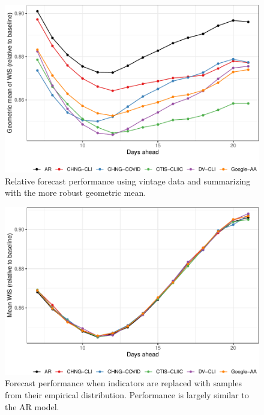 \documentclass[9pt,twoside,lineno]{pnas-new}
\begin{document}
\clearpage

\begin{figure}

{\centering \includegraphics[width=\textwidth]{fig/fcast-adjusted-1} 

}

\caption{Relative forecast performance using vintage data and summarizing with the more robust geometric mean.}\label{fig:fcast-adjusted}
\end{figure}

\clearpage

\begin{figure}

{\centering \includegraphics[width=\textwidth]{fig/fcast-booted-1} 

}

\caption{Forecast performance when indicators are replaced with samples from their empirical distribution. Performance is largely similar to the AR model.}\label{fig:fcast-booted}
\end{figure}
\end{document}
